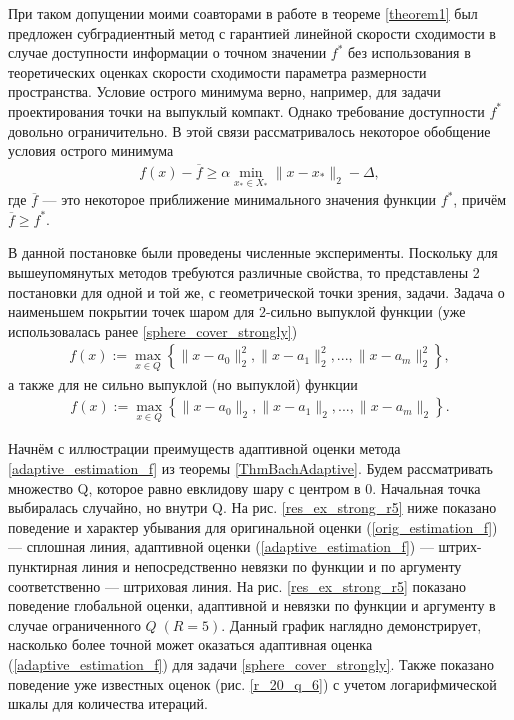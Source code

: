     При таком допущении моими соавторами в работе \cite{sharp22} в теореме \ref{theorem1} был предложен субградиентный метод с гарантией  линейной скорости сходимости в случае доступности информации о точном значении $f^*$ \cite{Polyak1969} без использования в теоретических оценках скорости сходимости  параметра размерности пространства. Условие острого минимума верно, например, для задачи проектирования точки на выпуклый компакт. Однако требование доступности $f^*$ довольно ограничительно. В этой связи рассматривалось некоторое обобщение условия острого минимума
    \begin{gather}\label{eq_gen_sharp}
        f(x) - \overline{f} \geq \alpha \min_{x_* \in X_*} \|x - x_* \|_2 - \Delta,
    \end{gather}
    где $\overline{f}$  --- это некоторое приближение минимального значения функции $f^*$, причём $\overline{f} \geq f^*$. 

    В данной постановке были проведены численные эксперименты. Поскольку для вышеупомянутых методов требуются различные свойства, то представлены 2 постановки для одной и той же, с геометрической точки зрения, задачи. Задача о наименьшем покрытии точек шаром для $2$-сильно выпуклой функции (уже использовалась ранее \eqref{sphere_cover_strongly})
    \begin{gather}
        f(x) := \max_{x\in Q}\left\{\|x - a_0\|_2^2, \|x - a_1\|_2^2, ..., \|x - a_m\|_2^2\right\},
    \end{gather}
    а также для не сильно выпуклой (но выпуклой) функции
    \begin{gather}\label{sphere_cover}
        f(x) := \max_{x\in Q}\left\{\|x - a_0\|_2, \|x - a_1\|_2, ..., \|x - a_m\|_2\right\}.
    \end{gather}

    Начнём с иллюстрации преимуществ адаптивной оценки метода \eqref{adaptive_estimation_f} из теоремы \ref{ThmBachAdaptive}. Будем рассматривать множество Q, которое равно евклидову шару с центром в 0. Начальная точка выбиралась случайно, но внутри Q. На рис. \ref{res_ex_strong_r5} ниже показано поведение и характер убывания для оригинальной оценки (\ref{orig_estimation_f}) --- сплошная линия, адаптивной оценки (\ref{adaptive_estimation_f}) --- штрих-пунктирная линия и непосредственно невязки по функции и по аргументу соответственно --- штриховая линия. На рис. \ref{res_ex_strong_r5} показано поведение глобальной оценки, адаптивной и невязки по функции и аргументу в случае ограниченного $Q \;(R = 5)$. Данный график наглядно демонстрирует, насколько более точной может оказаться адаптивная оценка (\ref{adaptive_estimation_f}) для задачи \eqref{sphere_cover_strongly}. Также показано поведение уже известных оценок (рис. \ref{r_20_q_6}) с учетом логарифмической шкалы для количества итераций.

